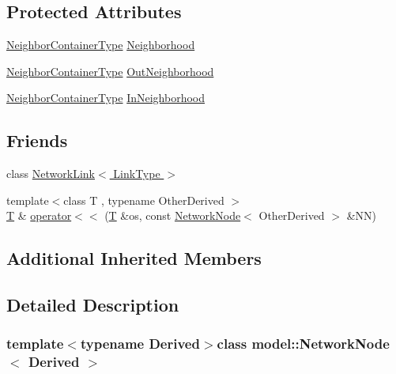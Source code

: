\subsection*{Protected Attributes}
\begin{DoxyCompactItemize}
\item 
\hyperlink{_spline_node_base__corder0_8h_a94e235f1dcb14194e28f14a3075d3296}{Neighbor\+Container\+Type} \hyperlink{classmodel_1_1_network_node_ac52cc261428091e6962d5522b6763669}{Neighborhood}
\item 
\hyperlink{_spline_node_base__corder0_8h_a94e235f1dcb14194e28f14a3075d3296}{Neighbor\+Container\+Type} \hyperlink{classmodel_1_1_network_node_a9a24def8118a94f9fd189357c03312e4}{Out\+Neighborhood}
\item 
\hyperlink{_spline_node_base__corder0_8h_a94e235f1dcb14194e28f14a3075d3296}{Neighbor\+Container\+Type} \hyperlink{classmodel_1_1_network_node_a73b39677473ad06b4af1df138be07ddb}{In\+Neighborhood}
\end{DoxyCompactItemize}
\subsection*{Friends}
\begin{DoxyCompactItemize}
\item 
class \hyperlink{classmodel_1_1_network_node_adabe2abbcc416a859b6d2afa22480684}{Network\+Link$<$ Link\+Type $>$}
\item 
{\footnotesize template$<$class T , typename Other\+Derived $>$ }\\\hyperlink{_spline_node_base__corder1_8h_a82692d3a5502b91460591f1d5504314a}{T} \& \hyperlink{classmodel_1_1_network_node_ac0ea917f0e3b428440ae53041a8ebf8d}{operator$<$$<$} (\hyperlink{_spline_node_base__corder1_8h_a82692d3a5502b91460591f1d5504314a}{T} \&os, const \hyperlink{classmodel_1_1_network_node}{Network\+Node}$<$ Other\+Derived $>$ \&N\+N)
\end{DoxyCompactItemize}
\subsection*{Additional Inherited Members}


\subsection{Detailed Description}
\subsubsection*{template$<$typename Derived$>$class model\+::\+Network\+Node$<$ Derived $>$}



